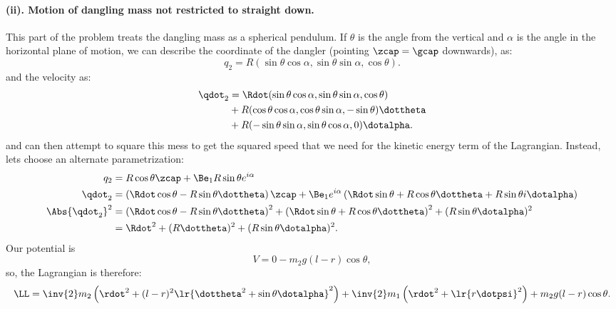 {\paragraph{(ii).  Motion of dangling mass not restricted to straight down.}
%
This part of the problem treats the dangling mass as a spherical pendulum.  If \(\theta\) is the angle from the vertical
and \(\alpha\) is the angle in the horizontal plane of motion, we can describe the coordinate of the dangler
(pointing \(\zcap = \gcap\) downwards), as:
%
\begin{equation}\label{eqn:tongMf1:2360}
q_2 = R( \sin\theta \cos\alpha, \sin\theta \sin\alpha, \cos\theta ).
\end{equation}
%
and the velocity as:
\begin{equation}\label{eqn:tongMf1:920}
\begin{aligned}
\qdot_2
&= \Rdot( \sin\theta \cos\alpha, \sin\theta \sin\alpha, \cos\theta ) \\
&+ R( \cos\theta \cos\alpha, \cos\theta \sin\alpha, -\sin\theta ) \dottheta \\
&+ R ( -\sin\theta \sin\alpha, \sin\theta \cos\alpha, 0) \dotalpha .
\end{aligned}
\end{equation}
%
and can then attempt to square this mess to get the squared speed that we need for the kinetic energy term of the Lagrangian.  Instead, lets choose an alternate parametrization:
%
\begin{equation}\label{eqn:tongMf1:940}
\begin{aligned}
q_2 &= R \cos\theta \zcap + \Be_1 R \sin\theta e^{i\alpha} \\
\qdot_2
&= \left(\Rdot \cos\theta - R \sin\theta \dottheta\right) \zcap
+ \Be_1 e^{i\alpha} \left( \Rdot \sin\theta + R \cos\theta \dottheta + R \sin\theta i \dotalpha \right) \\
\Abs{\qdot_2}^2
&= \left(\Rdot \cos\theta - R \sin\theta \dottheta\right)^2
+ \left( \Rdot \sin\theta + R \cos\theta \dottheta\right)^2
+ (R \sin\theta \dotalpha)^2 \\
&= \Rdot^2 + (R \dottheta)^2 + (R \sin\theta \dotalpha)^2 .
\end{aligned}
\end{equation}
%
Our potential is
%
\begin{equation}\label{eqn:tongMf1:2380}
V = 0 - m_2 g (l-r) \cos\theta,
\end{equation}
%
so, the Lagrangian is therefore:
%
\begin{equation}\label{eqn:tongMf1:960}
\LL = \inv{2} m_2 \left(\rdot^2 +
(l-r)^2
\lr{ \dottheta^2 + \sin\theta \dotalpha }^2
 \right) + \inv{2} m_1 \left(\rdot^2 +
\lr{ r\dotpsi }^2
\right) + m_2 g
(l-r) \cos\theta.
\end{equation}
}
